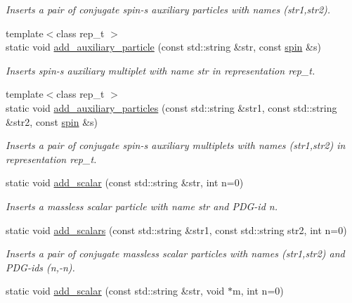 \begin{DoxyCompactItemize}
\begin{DoxyCompactList}\small\item\em Inserts a pair of conjugate spin-\/s auxiliary particles with names (str1,str2). \end{DoxyCompactList}\item 
{\footnotesize template$<$class rep\+\_\+t $>$ }\\static void \hyperlink{a00372_aa1e50838292e002cb2997f8d34e376bf}{add\+\_\+auxiliary\+\_\+particle} (const std\+::string \&str, const \hyperlink{a00514}{spin} \&s)
\begin{DoxyCompactList}\small\item\em Inserts spin-\/s auxiliary multiplet with name str in representation rep\+\_\+t. \end{DoxyCompactList}\item 
\hypertarget{a00372_a8888489c8a72e26cba9a34772adabf8a}{}{\footnotesize template$<$class rep\+\_\+t $>$ }\\static void \hyperlink{a00372_a8888489c8a72e26cba9a34772adabf8a}{add\+\_\+auxiliary\+\_\+particles} (const std\+::string \&str1, const std\+::string \&str2, const \hyperlink{a00514}{spin} \&s)\label{a00372_a8888489c8a72e26cba9a34772adabf8a}

\begin{DoxyCompactList}\small\item\em Inserts a pair of conjugate spin-\/s auxiliary multiplets with names (str1,str2) in representation rep\+\_\+t. \end{DoxyCompactList}\item 
\hypertarget{a00372_a2472b1dfd3f7da1bbba6140aad987257}{}static void \hyperlink{a00372_a2472b1dfd3f7da1bbba6140aad987257}{add\+\_\+scalar} (const std\+::string \&str, int n=0)\label{a00372_a2472b1dfd3f7da1bbba6140aad987257}

\begin{DoxyCompactList}\small\item\em Inserts a massless scalar particle with name str and P\+D\+G-\/id n. \end{DoxyCompactList}\item 
\hypertarget{a00372_a9030576274aac8572d1546868e46e650}{}static void \hyperlink{a00372_a9030576274aac8572d1546868e46e650}{add\+\_\+scalars} (const std\+::string \&str1, const std\+::string str2, int n=0)\label{a00372_a9030576274aac8572d1546868e46e650}

\begin{DoxyCompactList}\small\item\em Inserts a pair of conjugate massless scalar particles with names (str1,str2) and P\+D\+G-\/ids (n,-\/n). \end{DoxyCompactList}\item 
\hypertarget{a00372_ad83cae9524f80d31eed52d6b28b99bfa}{}static void \hyperlink{a00372_ad83cae9524f80d31eed52d6b28b99bfa}{add\+\_\+scalar} (const std\+::string \&str, void $\ast$m, int n=0)\label{a00372_ad83cae9524f80d31eed52d6b28b99bfa}


\end{DoxyCompactItemize}

